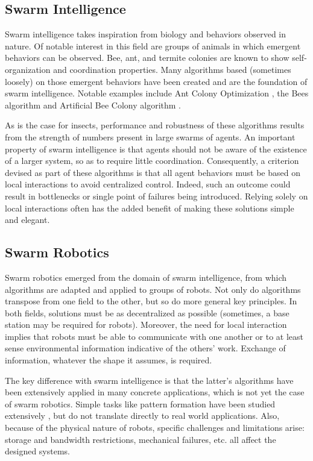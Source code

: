 \subsection{Swarm Intelligence}
Swarm intelligence takes inspiration from biology and behaviors observed in nature. Of notable interest in this field are groups of animals in which emergent behaviors can be observed. Bee, ant, and termite colonies are known to show self-organization and coordination properties. Many algorithms based (sometimes loosely) on those emergent behaviors have been created and are the foundation of swarm intelligence. Notable examples include Ant Colony Optimization \cite{colorni1991distributed}, the Bees algorithm \cite{pham2006bees} and Artificial Bee Colony algorithm \cite{karaboga2010artificial}.

As is the case for insects, performance and robustness of these algorithms results from the strength of numbers present in large swarms of agents. An important property of swarm intelligence is that agents should not be aware of the existence of a larger system, so as to require little coordination. Consequently, a criterion devised as part of these algorithms is that all agent behaviors must be based on local interactions to avoid centralized control. Indeed, such an outcome could result in bottlenecks or single point of failures being introduced. Relying solely on local interactions often has the added benefit of making these solutions simple and elegant.

\subsection{Swarm Robotics}
Swarm robotics emerged from the domain of swarm intelligence, from which algorithms are adapted and applied to groups of robots. Not only do algorithms transpose from one field to the other, but so do more general key principles. In both fields, solutions must be as decentralized as possible (sometimes, a base station may be required for robots). Moreover, the need for local interaction implies that robots must be able to communicate with one another or to at least sense environmental information indicative of the others' work. Exchange of information, whatever the shape it assumes, is required.

The key difference with swarm intelligence is that the latter's algorithms have been extensively applied in many concrete applications, which is not yet the case of swarm robotics. Simple tasks like pattern formation have been studied extensively \cite{hamann2008framework,vicsek2012collective,coppola2019provable}, but do not translate directly to real world applications. Also, because of the physical nature of robots, specific challenges and limitations arise: storage and bandwidth restrictions, mechanical failures, etc. all affect the designed systems.

